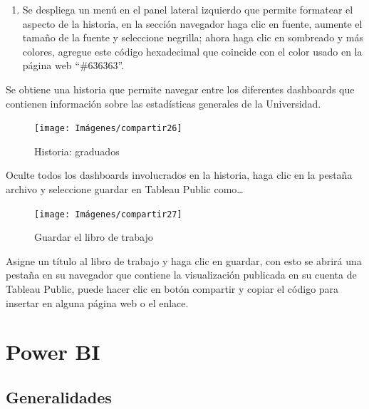 \documentclass[
]{book}
\providecommand{\tightlist}{%
  \setlength{\itemsep}{0pt}\setlength{\parskip}{0pt}}
\begin{document}
\begin{enumerate}
\def\labelenumi{\arabic{enumi}.}
\setcounter{enumi}{6}
\tightlist
\item
  Se despliega un menú en el panel lateral izquierdo que permite formatear el aspecto de la historia, en la sección navegador haga clic en fuente, aumente el tamaño de la fuente y seleccione negrilla; ahora haga clic en sombreado y más colores, agregue este código hexadecimal que coincide con el color usado en la página web ``\#636363''.
\end{enumerate}

Se obtiene una historia que permite navegar entre los diferentes dashboards que contienen información sobre las estadísticas generales de la Universidad.

\begin{figure}

{\centering \texttt{[image: Imágenes/compartir26]} 

}

\caption{Historia: graduados}\label{fig:historiagraduados-fig}
\end{figure}

Oculte todos los dashboards involucrados en la historia, haga clic en la pestaña archivo y seleccione guardar en Tableau Public como\ldots{}

\begin{figure}

{\centering \texttt{[image: Imágenes/compartir27]} 

}

\caption{Guardar el libro de trabajo}\label{fig:guardarlibroddetrabajo-fig}
\end{figure}

Asigne un título al libro de trabajo y haga clic en guardar, con esto se abrirá una pestaña en su navegador que contiene la visualización publicada en su cuenta de Tableau Public, puede hacer clic en botón compartir y copiar el código para insertar en alguna página web o el enlace.

\hypertarget{powerbi}{%
\chapter{Power BI}\label{powerbi}}

\hypertarget{generalidadespowerbi}{%
\section{Generalidades}\label{generalidadespowerbi}}
\end{document}
